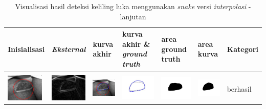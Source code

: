 \begin{table}[H]
	\centering
	\caption{Visualisasi hasil deteksi keliling luka menggunakan \emph{snake} versi \emph{interpolasi} - lanjutan}
	\label{tabel_hasil_9_interp}
	\begin{tabular}{|m{0.7in}|m{0.7in}|m{0.7in}|m{0.7in}|m{0.7in}|m{0.7in}|m{0.7in}|}
		\hline
		\textbf{Inisialisasi} & \textbf{\emph{Eksternal}} & \textbf{kurva akhir} & \textbf{kurva akhir \& \emph{ground truth}}& \textbf{area ground truth} & \textbf{area kurva} & \textbf{Kategori} \\
		\hline
		
		&  &  & & & &  \\
		\includegraphics[width=0.7in]{dataset/dataset_3/luka_merah/ready/16_interp_init.jpg}&
		\includegraphics[width=0.7in]{dataset/dataset_3/luka_merah/ready/16_interp_ext.jpg}&
		\includegraphics[width=0.7in]{dataset/dataset_3/luka_merah/ready/16_interp_result.jpg}&
		\includegraphics[width=0.7in]{dataset/dataset_3/luka_merah/ready/16_gt_r.jpg}&
		\includegraphics[width=0.7in]{dataset/dataset_3/luka_merah/ready/16_r.jpg}&
		\includegraphics[width=0.7in]{dataset/dataset_3/luka_merah/ready/16_interp_r.jpg}&
		berhasil\\
		\hline
		

\end{tabular}
\end{table}
